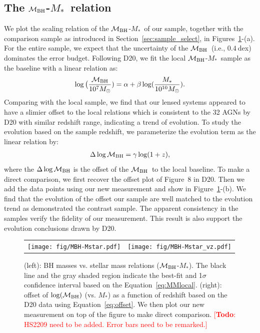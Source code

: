 \documentclass[fleqn,usenatbib]{mnras}
\newcommand{\mbh}{$\mathcal M_{\rm BH}$}
\newcommand{\mstar}{{$M_*$}}
\newcommand{\todo}[1]{\textcolor{red}{[{\bf Todo}: #1]}}
\begin{document}
\subsection{The \mbh-\mstar\ relation}\label{sec:relation}
We plot the scaling relation of the \mbh-\mstar\ of our sample, together with the comparison sample as introduced in Section~\ref{sec:sample_select}, in Figures~\ref{fig:scaling_relation}-(a). For the entire sample, we expect that the uncertainty of the \mbh\ (i.e., $0.4~$dex) dominates the error budget. Following D20, we fit the local \mbh-\mstar\ sample as the baseline with a linear relation as:
\begin{eqnarray}
\label{eq:MMlocal}
\log \big( \frac{\mathcal M_{\rm BH}}{10^{7}M_{\odot}})= \alpha + \beta \log(\frac{M_*}{10^{10}M_{\odot}}).
\end {eqnarray}
Comparing with the local sample, we find that our lensed systems appeared to have a slimier offset to the local relations which is consistent to the 32 AGNs by D20 with similar redshift range, indicating a trend of evolution. To study the evolution based on the sample redshift, we parameterize the evolution term as the linear relation by:
\begin{eqnarray}
\label{eq:offset}
\Delta \log \mathcal M_{\rm BH}= \gamma \log (1 + z),
\end{eqnarray} 
where the $\Delta \log \mathcal M_{\rm BH}$ is the offset of the \mbh\ to the local baseline. To make a direct comparison, we first recover the offset plot of Figure~8 in D20. Then we add the data points using our new measurement and show in Figure~\ref{fig:scaling_relation}-(b). We find that the evolution of the offset our sample are well matched to the evolution trend as demonstrated the contrast sample. %
The apparent consistency in the samples verify the fidelity of our measurement. This result is also support the evolution conclusions drawn by D20.

\begin{figure}
\centering
\begin{tabular}{c c}
{\texttt{[image: fig/MBH-Mstar.pdf]}}&
{\texttt{[image: fig/MBH-Mstar\_vz.pdf]}}\\
\end{tabular}
\caption{\label{fig:scaling_relation} 
(left): BH masses vs. stellar mass relations (\mbh-\mstar). The black line and the gray shaded region indicate the best-fit and 1$\sigma$ confidence interval based on the Equation~\ref{eq:MMlocal}.
(right): offset of $\log(\mathcal M_{\rm BH})$ (vs. \mstar) as a function of redshift based on the D20 data using Equation~\ref{eq:offset}. We then plot our new measurement on top of the figure to make direct comparison. 
\todo{HS2209 need to be added. Error bars need to be remarked.}}
\end{figure} 
\end{document}
